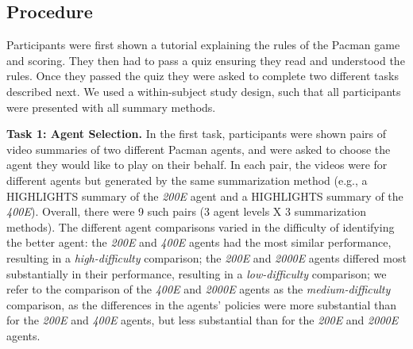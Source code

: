 



\subsection{Procedure}
\label{sec:procedure}
Participants were first shown a tutorial explaining the rules of the Pacman game and scoring. They then had to pass a quiz ensuring they read and understood the rules. Once they passed the quiz they were asked to complete two different tasks described next. We used a within-subject study design, such that all participants were presented with all summary methods. 

\textbf{Task 1: Agent Selection.}
In the first task, participants were shown pairs of video summaries of two different Pacman agents, and were asked to choose the agent they would like to play on their behalf. In each pair, the videos were for different agents   but generated by the same summarization method (e.g., a HIGHLIGHTS summary of the \emph{200E} agent and a HIGHLIGHTS summary of the \emph{400E}). Overall, there were 9 such pairs (3 agent levels X 3 summarization methods). The different agent comparisons varied in the difficulty of identifying the better agent: the \emph{200E} and \emph{400E} agents had the most similar performance, resulting in a \emph{high-difficulty} comparison; the \emph{200E} and \emph{2000E} agents differed most substantially in their performance, resulting in a \emph{low-difficulty} comparison; we refer to the comparison of  the \emph{400E} and \emph{2000E} agents as the \emph{medium-difficulty} comparison, as the differences in the agents' policies were more substantial than for the \emph{200E} and \emph{400E} agents, but less substantial than for the \emph{200E} and \emph{2000E} agents. 

